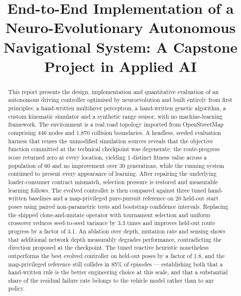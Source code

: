 \documentclass[conference]{IEEEtran}
\begin{document}
\title{End-to-End Implementation of a Neuro-Evolutionary Autonomous Navigational System: A Capstone Project in Applied AI}
\author{
}

\maketitle

\begin{abstract}
This report presents the design, implementation and quantitative evaluation of an autonomous driving controller optimised by neuroevolution and built entirely from first principles: a hand-written multilayer perceptron, a hand-written genetic algorithm, a custom kinematic simulator and a synthetic range sensor, with no machine-learning framework. The environment is a real road topology imported from OpenStreetMap comprising 446 nodes and 1,870 collision boundaries. A headless, seeded evaluation harness that reuses the unmodified simulation sources reveals that the objective function committed at the technical checkpoint was degenerate: the route-progress score returned zero at every location, yielding 1 distinct fitness value across a population of 60 and no improvement over 30 generations, while the running system continued to present every appearance of learning. After repairing the underlying loader-consumer contract mismatch, selection pressure is restored and measurable learning follows. The evolved controller is then compared against three tuned hand-written baselines and a map-privileged pure-pursuit reference on 20 held-out start poses using paired non-parametric tests and bootstrap confidence intervals. Replacing the shipped clone-and-mutate operator with tournament selection and uniform crossover reduces seed-to-seed variance by 3.3 times and improves held-out route progress by a factor of 3.1. An ablation over depth, mutation rate and sensing shows that additional network depth measurably degrades performance, contradicting the direction proposed at the checkpoint. The tuned reactive heuristic nonetheless outperforms the best evolved controller on held-out poses by a factor of 1.8, and the map-privileged reference still collides in 85\% of episodes — establishing both that a hand-written rule is the better engineering choice at this scale, and that a substantial share of the residual failure rate belongs to the vehicle model rather than to any policy.
\end{abstract}
\end{document}
